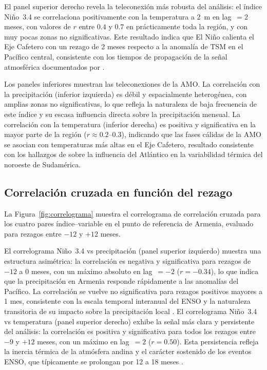 \documentclass[12pt, a4paper]{article}
\begin{document}
El panel superior derecho revela la teleconexión más robusta del análisis: el
índice Niño~3.4 se correlaciona positivamente con la temperatura a 2~m en
lag~$= 2$ meses, con valores de $r$ entre $0.4$ y $0.7$ en prácticamente toda
la región, y con muy pocas zonas no significativas. Este resultado indica que
El Niño calienta el Eje Cafetero con un rezago de 2 meses respecto a la
anomalía de TSM en el Pacífico central, consistente con los tiempos de propagación
de la señal atmosférica documentados por \citet{CórdobaMachado2015a}.

Los paneles inferiores muestran las teleconexiones de la AMO. La correlación
con la precipitación (inferior izquierda) es débil y espacialmente heterogénea,
con amplias zonas no significativas, lo que refleja la naturaleza de baja
frecuencia de este índice y su escasa influencia directa sobre la precipitación
mensual. La correlación con la temperatura (inferior derecha) es positiva y
significativa en la mayor parte de la región ($r \approx 0.2$--$0.3$), indicando
que las fases cálidas de la AMO se asocian con temperaturas más altas en el Eje
Cafetero, resultado consistente con los hallazgos de \citet{DuqueGardeazabal2025}
sobre la influencia del Atlántico en la variabilidad térmica del noroeste de
Sudamérica.

\subsection{Correlación cruzada en función del rezago}

La Figura~\ref{fig:correlograma} muestra el correlograma de correlación cruzada
para los cuatro pares índice--variable en el punto de referencia de Armenia,
evaluado para rezagos entre $-12$ y $+12$ meses.

El correlograma Niño~3.4 vs precipitación (panel superior izquierdo) muestra
una estructura asimétrica: la correlación es negativa y significativa para
rezagos de $-12$ a $0$ meses, con un máximo absoluto en lag~$= -2$
($r = -0.34$), lo que indica que la precipitación en Armenia responde
rápidamente a las anomalías del Pacífico. La correlación se vuelve no
significativa para rezagos positivos mayores a 1 mes, consistente con la
escala temporal interanual del ENSO y la naturaleza transitoria de su impacto
sobre la precipitación local \citep{Poveda2001}.
El correlograma Niño~3.4 vs temperatura (panel superior derecho) exhibe la
señal más clara y persistente del análisis: la correlación es positiva y
significativa para todos los rezagos entre $-9$ y $+12$ meses, con un máximo
en lag~$= 2$ ($r = 0.50$). Esta persistencia refleja la inercia térmica de la
atmósfera andina y el carácter sostenido de los eventos ENSO, que típicamente
se prolongan por 12 a 18 meses \citep{Poveda2011}.
\end{document}

